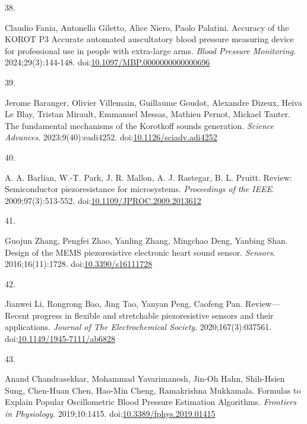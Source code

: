 \documentclass[
  12pt,
  letterpaper,
  openany,
  oneside]{book}
\newlength{\cslhangindent}
\newlength{\csllabelwidth}
\newenvironment{CSLReferences}[2] %
 {\begin{list}{}{%
  \setlength{\itemindent}{0pt}
  \setlength{\leftmargin}{0pt}
  \setlength{\parsep}{0pt}
  \ifodd #1
   \setlength{\leftmargin}{\cslhangindent}
   \setlength{\itemindent}{-1\cslhangindent}
  \fi
  \setlength{\itemsep}{#2\baselineskip}}}
 {\end{list}}
\newcommand{\CSLLeftMargin}[1]{\parbox[t]{\csllabelwidth}{\strut#1\strut}}
\newcommand{\CSLRightInline}[1]{\parbox[t]{\linewidth - \csllabelwidth}{\strut#1\strut}}
\begin{document}
\begin{CSLReferences}{0}{1}
\CSLLeftMargin{38. }%
\CSLRightInline{Claudio Fania, Antonella Giletto, Alice Niero, Paolo
Palatini. Accuracy of the {KOROT} {P3} {Accurate} automated auscultatory
blood pressure measuring device for professional use in people with
extra-large arms. \emph{Blood Pressure Monitoring}. 2024;29(3):144-148.
doi:\href{https://doi.org/10.1097/MBP.0000000000000696}{10.1097/MBP.0000000000000696}}

\CSLLeftMargin{39. }%
\CSLRightInline{Jerome Baranger, Olivier Villemain, Guillaume Goudot,
Alexandre Dizeux, Heiva Le Blay, Tristan Mirault, Emmanuel Messas,
Mathieu Pernot, Mickael Tanter. The fundamental mechanisms of the
{Korotkoff} sounds generation. \emph{Science Advances}.
2023;9(40):eadi4252.
doi:\href{https://doi.org/10.1126/sciadv.adi4252}{10.1126/sciadv.adi4252}}

\CSLLeftMargin{40. }%
\CSLRightInline{A. A. Barlian, W.-T. Park, J. R. Mallon, A. J. Rastegar,
B. L. Pruitt. Review: {Semiconductor} piezoresistance for microsystems.
\emph{Proceedings of the IEEE}. 2009;97(3):513-552.
doi:\href{https://doi.org/10.1109/JPROC.2009.2013612}{10.1109/JPROC.2009.2013612}}

\CSLLeftMargin{41. }%
\CSLRightInline{Guojun Zhang, Pengfei Zhao, Yanling Zhang, Mingchao
Deng, Yanbing Shan. Design of the {MEMS} piezoresistive electronic heart
sound sensor. \emph{Sensors}. 2016;16(11):1728.
doi:\href{https://doi.org/10.3390/s16111728}{10.3390/s16111728}}

\CSLLeftMargin{42. }%
\CSLRightInline{Jianwei Li, Rongrong Bao, Jing Tao, Yanyan Peng, Caofeng
Pan. Review---{Recent} progress in flexible and stretchable
piezoresistive sensors and their applications. \emph{Journal of The
Electrochemical Society}. 2020;167(3):037561.
doi:\href{https://doi.org/10.1149/1945-7111/ab6828}{10.1149/1945-7111/ab6828}}

\CSLLeftMargin{43. }%
\CSLRightInline{Anand Chandrasekhar, Mohammad Yavarimanesh, Jin-Oh Hahn,
Shih-Hsien Sung, Chen-Huan Chen, Hao-Min Cheng, Ramakrishna Mukkamala.
Formulas to {Explain} {Popular} {Oscillometric} {Blood} {Pressure}
{Estimation} {Algorithms}. \emph{Frontiers in Physiology}. 2019;10:1415.
doi:\href{https://doi.org/10.3389/fphys.2019.01415}{10.3389/fphys.2019.01415}}


\end{CSLReferences}
\end{document}

